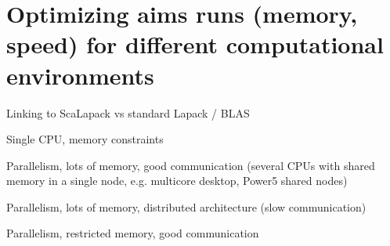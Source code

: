 \chapter{Optimizing aims runs (memory, speed) for different computational environments}

\label{appendix_optimization}

   Linking to ScaLapack vs standard Lapack / BLAS

   Single CPU, memory constraints

   Parallelism, lots of memory, good communication (several CPUs with shared
   memory in a single node, e.g. multicore desktop, Power5 shared nodes)

   Parallelism, lots of memory, distributed architecture (slow communication)

   Parallelism, restricted memory, good communication
